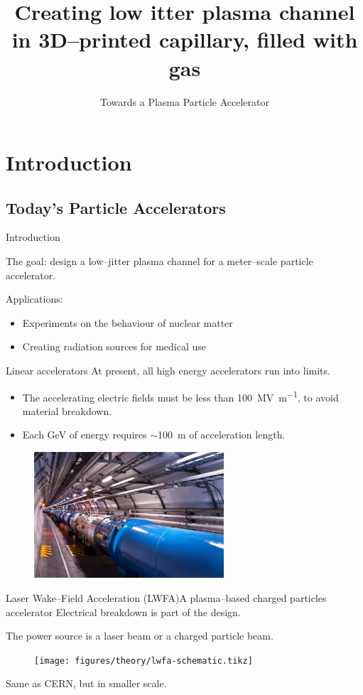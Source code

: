 \documentclass[dvipsnames]{beamer}
\title[]{Creating low itter plasma channel in 3D--printed capillary, filled with gas}
\subtitle{Towards a Plasma Particle Accelerator}
\author[]{{Ehud Behar} \\
{\and} \\
{\textit{Supervisors}} \\
{Dr. Amir Capua} \\ {Prof. Arie Zigler}}
\institute{The Hebrew University of Jerusalem}
\begin{document}
\frame{\titlepage}

\section{Introduction}
\subsection[]{Today's Particle Accelerators}
  \begin{frame}{Introduction}
  \begin{center}
    The goal: design a low--jitter plasma channel for a meter--scale particle accelerator.
  \end{center}
    Applications:
    \begin{itemize}
        \item[\textbullet] Experiments on the behaviour of nuclear matter
        \item[\textbullet] Creating radiation sources for medical use
    \end{itemize}
  \end{frame}

\begin{frame}{Linear accelerators}
At present, all high energy accelerators run into limits.
\begin{itemize}
\item[\textbullet] The accelerating electric fields must be less than \SI[per-mode=symbol]{100}{\mega \V \per\meter}, to avoid material breakdown.
\item[\textbullet] Each \si{\giga \eV} of energy requires $\sim$\SI{100}{\meter} of acceleration length.
\end{itemize}
\begin{figure}
\includegraphics[width=200pt]{figures/theory/lhc_cern_compressed.jpg}
\end{figure}
\end{frame}
\begin{frame}{Laser Wake--Field Acceleration (LWFA)}{A plasma--based charged particles accelerator}
Electrical breakdown is part of the design.

The power source is a laser beam or a charged particle beam.
\begin{figure}
\texttt{[image: figures/theory/lwfa-schematic.tikz]}
\end{figure}
Same as CERN, but in smaller scale.
\end{frame}
\end{document}
